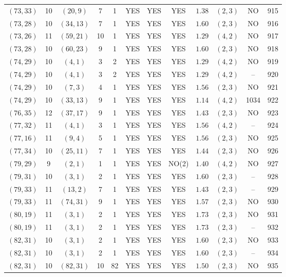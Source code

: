 \begin{longtable}{|c|c|c|c|c|c|c|c|c|c|c|c|}
$(73,33)$ & 10 & $(20,9)$ & 7 & 1 & YES & YES & YES & $1.38$ & $(2,3)$ & NO & 915\\
$(73,28)$ & 10 & $(34,13)$ & 7 & 1 & YES & YES & YES & $1.60$ & $(2,3)$ & NO & 916\\
$(73,26)$ & 11 & $(59,21)$ & 10 & 1 & YES & YES & YES & $1.29$ & $(4,2)$ & NO & 917\\
$(73,28)$ & 10 & $(60,23)$ & 9 & 1 & YES & YES & YES & $1.60$ & $(2,3)$ & NO & 918\\
$(74,29)$ & 10 & $(4,1)$ & 3 & 2 & YES & YES & YES & $1.29$ & $(4,2)$ & NO & 919\\
$(74,29)$ & 10 & $(4,1)$ & 3 & 2 & YES & YES & YES & $1.29$ & $(4,2)$ & -- & 920\\
$(74,29)$ & 10 & $(7,3)$ & 4 & 1 & YES & YES & YES & $1.56$ & $(2,3)$ & NO & 921\\
$(74,29)$ & 10 & $(33,13)$ & 9 & 1 & YES & YES & YES & $1.14$ & $(4,2)$ & 1034 & 922\\
$(76,35)$ & 12 & $(37,17)$ & 9 & 1 & YES & YES & YES & $1.43$ & $(2,3)$ & NO & 923\\
$(77,32)$ & 11 & $(4,1)$ & 3 & 1 & YES & YES & YES & $1.56$ & $(4,2)$ & -- & 924\\
$(77,16)$ & 11 & $(9,4)$ & 5 & 1 & YES & YES & YES & $1.56$ & $(2,3)$ & NO & 925\\
$(77,34)$ & 10 & $(25,11)$ & 7 & 1 & YES & YES & YES & $1.44$ & $(2,3)$ & NO & 926\\
$(79,29)$ & 9 & $(2,1)$ & 1 & 1 & YES & YES & NO(2) & $1.40$ & $(4,2)$ & NO & 927\\
$(79,31)$ & 10 & $(3,1)$ & 2 & 1 & YES & YES & YES & $1.60$ & $(2,3)$ & -- & 928\\
$(79,33)$ & 11 & $(13,2)$ & 7 & 1 & YES & YES & YES & $1.43$ & $(2,3)$ & -- & 929\\
$(79,33)$ & 11 & $(74,31)$ & 9 & 1 & YES & YES & YES & $1.57$ & $(2,3)$ & NO & 930\\
$(80,19)$ & 11 & $(3,1)$ & 2 & 1 & YES & YES & YES & $1.73$ & $(2,3)$ & NO & 931\\
$(80,19)$ & 11 & $(3,1)$ & 2 & 1 & YES & YES & YES & $1.73$ & $(2,3)$ & -- & 932\\
$(82,31)$ & 10 & $(3,1)$ & 2 & 1 & YES & YES & YES & $1.60$ & $(2,3)$ & NO & 933\\
$(82,31)$ & 10 & $(3,1)$ & 2 & 1 & YES & YES & YES & $1.60$ & $(2,3)$ & -- & 934\\
$(82,31)$ & 10 & $(82,31)$ & 10 & 82 & YES & YES & YES & $1.50$ & $(2,3)$ & NO & 935\\

\end{longtable}
